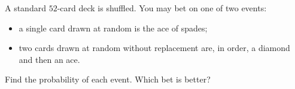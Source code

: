 A standard \(52\)-card deck is shuffled. You may bet on one of two events:
\begin{itemize}
\item[(i)] a single card drawn at random is the ace of spades;
\item[(ii)] two cards drawn at random without replacement are, in order, a diamond and then an ace.
\end{itemize}
Find the probability of each event. Which bet is better?
